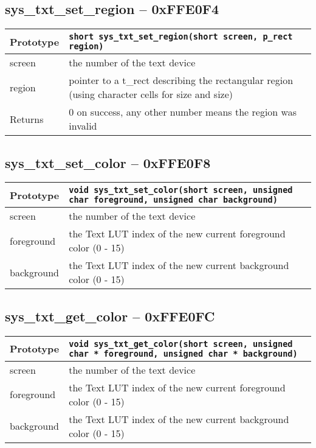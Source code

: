\subsection*{sys\_txt\_set\_region -- 0xFFE0F4}
\begin{tabular}{|l||l|} \hline
Prototype & \lstinline!short sys_txt_set_region(short screen, p_rect region)! \\ \hline
screen & the number of the text device \\ \hline
region & pointer to a t\_rect describing the rectangular region (using character cells for size and size) \\ \hline
Returns & 0 on success, any other number means the region was invalid \\ \hline
\end{tabular}

\subsection*{sys\_txt\_set\_color -- 0xFFE0F8}
\begin{tabular}{|l||l|} \hline
Prototype & \lstinline!void sys_txt_set_color(short screen, unsigned char foreground, unsigned char background)! \\ \hline
screen & the number of the text device \\ \hline
foreground & the Text LUT index of the new current foreground color (0 - 15) \\ \hline
background & the Text LUT index of the new current background color (0 - 15) \\ \hline
\end{tabular}

\subsection*{sys\_txt\_get\_color -- 0xFFE0FC}
\begin{tabular}{|l||l|} \hline
Prototype & \lstinline!void sys_txt_get_color(short screen, unsigned char * foreground, unsigned char * background)! \\ \hline
screen & the number of the text device \\ \hline
foreground & the Text LUT index of the new current foreground color (0 - 15) \\ \hline
background & the Text LUT index of the new current background color (0 - 15) \\ \hline
\end{tabular}

